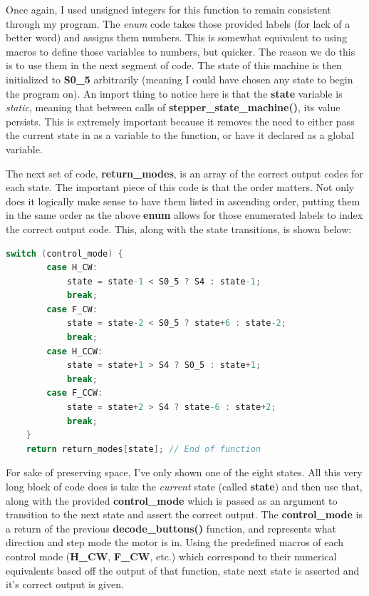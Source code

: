 \documentclass[a4paper, 12pt]{article}
\begin{document}
Once again, I used unsigned integers for this function to remain consistent through my program. The \textit{enum} code takes those provided labels (for lack of a better word) and assigns them numbers. This is somewhat equivalent to using macros to define those variables to numbers, but quicker. The reason we do this is to use them in the next segment of code. The state of this machine is then initialized to \textbf{S0\_5} arbitrarily (meaning I could have chosen any state to begin the program on). An import thing to notice here is that the \textbf{state} variable is \textit{static}, meaning that between calls of \textbf{stepper\_state\_machine()}, its value persists. This is extremely important because it removes the need to either pass the current state in as a variable to the function, or have it declared as a global variable. 

The next set of code, \textbf{return\_modes}, is an array of the correct output codes for each state. The important piece of this code is that the order matters. Not only does it logically make sense to have them listed in ascending order, putting them in the same order as the above \textbf{enum} allows for those enumerated labels to index the correct output code. This, along with the state transitions, is shown below:

	\begin{mdframed}[backgroundcolor=code-gray, roundcorner=10pt,
								innerleftmargin=5, innertopmargin=5, innerbottommargin=5]	
	\begin{lstlisting}[language=C, caption=State Machine Transition \& Output Assertion, tabsize=2]
	switch (control_mode) {
		case H_CW:
			state = state-1 < S0_5 ? S4 : state-1;
			break;
		case F_CW:
			state = state-2 < S0_5 ? state+6 : state-2;
			break;
		case H_CCW:
			state = state+1 > S4 ? S0_5 : state+1;
			break;
		case F_CCW:
			state = state+2 > S4 ? state-6 : state+2;
			break;
	}
	return return_modes[state]; // End of function
	\end{lstlisting}
	\end{mdframed}
	
For sake of preserving space, I've only shown one of the eight states. All this very long block of code does is take the \textit{current} state (called \textbf{state}) and then use that, along with the provided \textbf{control\_mode} which is passed as an argument to transition to the next state and assert the correct output. The \textbf{control\_mode} is a return of the previous \textbf{decode\_buttons()} function, and represents what direction and step mode the motor is in. Using the predefined macros of each control mode (\textbf{H\_CW}, \textbf{F\_CW}, etc.) which correspond to their numerical equivalents based off the output of that function, state next state is asserted and it's correct output is given.
\end{document}
